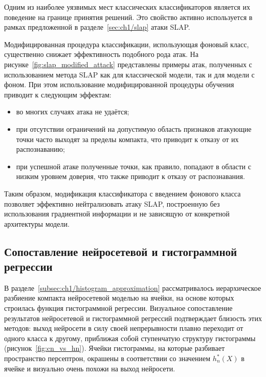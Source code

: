 Одним из наиболее уязвимых мест классических классификаторов является их поведение на границе принятия решений. Это свойство активно используется в рамках предложенной в разделе~\cref{sec:ch1/slap} атаки SLAP.

Модифицированная процедура классификации, использующая фоновый класс, существенно снижает эффективность подобного рода атак. На рисунке~\cref{fig:slap_modified_attack} представлены примеры атак, полученных с использованием метода SLAP как для классической модели, так и для модели с фоном. При этом использование модифицированной процедуры обучения приводит к следующим эффектам:

\begin{itemize}
  \item во многих случаях атака не удаётся;
  \item при отсутствии ограничений на допустимую область признаков атакующие точки часто выходят за пределы компакта, что приводит к отказу от их распознаванию;
  \item при успешной атаке полученные точки, как правило, попадают в области с низким уровнем доверия, что также приводит к отказу от распознавания.
\end{itemize}

Таким образом, модификация классификатора с введением фонового класса позволяет эффективно нейтрализовать атаку SLAP, построенную без использования градиентной информации и не зависящую от конкретной архитектуры модели.

\subsection{Сопоставление нейросетевой и гистограммной регрессии}

В разделе~\cref{subsec:ch1/histogram_approximation} рассматривалось иерархическое разбиение компакта нейросетевой моделью на ячейки, на основе которых строилась функция гистограммной регрессии. Визуальное сопоставление результатов нейросетевой и гистограммной регрессий подтверждает близость этих методов: выход нейросети в силу своей непрерывности плавно переходит от одного класса к другому, приближая собой ступенчатую структуру гистограммы (рисунок~\cref{fig:cn_vs_hn}). Ячейки гистограммы, на которые разбивает пространство персептрон, окрашены в соответствии со значением \(h_n^*(X)\) в ячейке и визуально очень похожи на выход нейросети.

